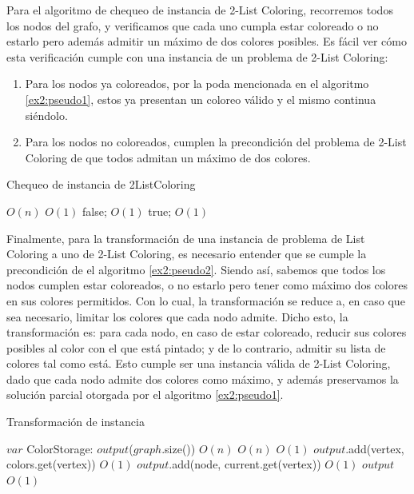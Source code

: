 \documentclass{article}
\theoremstyle{definition}
\theoremstyle{remark}
\begin{document}
Para el algoritmo de chequeo de instancia de 2-List Coloring, recorremos todos los nodos del grafo, y verificamos que cada uno cumpla estar coloreado o no estarlo pero además admitir un máximo de dos colores posibles. Es fácil ver cómo esta verificación cumple con una instancia de un problema de 2-List Coloring: 
\begin{enumerate}
\item Para los nodos ya coloreados, por la poda mencionada en el algoritmo \ref{ex2:pseudo1}, estos ya presentan un coloreo válido y el mismo continua siéndolo.
\item Para los nodos no coloreados, cumplen la precondición del problema de 2-List Coloring de que todos admitan un máximo de dos colores.
\end{enumerate}


\begin{algorithm}
\caption{Chequeo de instancia de 2ListColoring}
\label{ex2:pseudo2}

\begin{algorithmic}
 \Comment $O(n)$
     \Comment $O(1)$
        \State \Return false; \Comment $O(1)$
    \EndIf
\EndFor
\State \Return true; \Comment $O(1)$
\EndFunction
\end{algorithmic}
\end{algorithm}


Finalmente, para la transformación de una instancia de problema de List Coloring a uno de 2-List Coloring, es necesario entender que se cumple la precondición de el algoritmo \ref{ex2:pseudo2}. Siendo así, sabemos que todos los nodos cumplen estar coloreados, o no estarlo pero tener como máximo dos colores en sus colores permitidos. Con lo cual, la transformación se reduce a, en caso que sea necesario, limitar los colores que cada nodo admite.
Dicho esto, la transformación es: para cada nodo, en caso de estar coloreado, reducir sus colores posibles al color con el que está pintado; y de lo contrario, admitir su lista de colores tal como está.
Esto cumple ser una instancia válida de 2-List Coloring, dado que cada nodo admite dos colores como máximo, y además preservamos la solución parcial otorgada por el algoritmo \ref{ex2:pseudo1}.


\begin{algorithm}
\caption{Transformación de instancia}
\label{ex2:pseudo3}

\begin{algorithmic}
\State $var$ ColorStorage: $output$($graph$.size()) \Comment $O(n)$
 \Comment $O(n)$
     \Comment $O(1)$
        \State $output$.add(vertex, colors.get(vertex)) \Comment $O(1)$
    \Else
        \State $output$.add(node, current.get(vertex)) \Comment $O(1)$
    \EndIf
\EndFor
\State \Return $output$ \Comment $O(1)$
\EndFunction
\end{algorithmic}
\end{algorithm}
\end{document}
